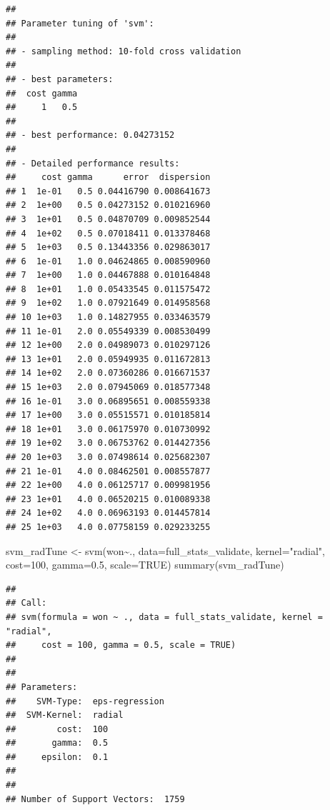 \documentclass[
]{article}
\newenvironment{Shaded}{\begin{snugshade}}{\end{snugshade}}
\newcommand{\AttributeTok}[1]{\textcolor[rgb]{0.77,0.63,0.00}{#1}}
\newcommand{\ConstantTok}[1]{\textcolor[rgb]{0.00,0.00,0.00}{#1}}
\newcommand{\DecValTok}[1]{\textcolor[rgb]{0.00,0.00,0.81}{#1}}
\newcommand{\FloatTok}[1]{\textcolor[rgb]{0.00,0.00,0.81}{#1}}
\newcommand{\FunctionTok}[1]{\textcolor[rgb]{0.00,0.00,0.00}{#1}}
\newcommand{\NormalTok}[1]{#1}
\newcommand{\OtherTok}[1]{\textcolor[rgb]{0.56,0.35,0.01}{#1}}
\newcommand{\SpecialCharTok}[1]{\textcolor[rgb]{0.00,0.00,0.00}{#1}}
\newcommand{\StringTok}[1]{\textcolor[rgb]{0.31,0.60,0.02}{#1}}
\begin{document}
\begin{verbatim}
## 
## Parameter tuning of 'svm':
## 
## - sampling method: 10-fold cross validation 
## 
## - best parameters:
##  cost gamma
##     1   0.5
## 
## - best performance: 0.04273152 
## 
## - Detailed performance results:
##     cost gamma      error  dispersion
## 1  1e-01   0.5 0.04416790 0.008641673
## 2  1e+00   0.5 0.04273152 0.010216960
## 3  1e+01   0.5 0.04870709 0.009852544
## 4  1e+02   0.5 0.07018411 0.013378468
## 5  1e+03   0.5 0.13443356 0.029863017
## 6  1e-01   1.0 0.04624865 0.008590960
## 7  1e+00   1.0 0.04467888 0.010164848
## 8  1e+01   1.0 0.05433545 0.011575472
## 9  1e+02   1.0 0.07921649 0.014958568
## 10 1e+03   1.0 0.14827955 0.033463579
## 11 1e-01   2.0 0.05549339 0.008530499
## 12 1e+00   2.0 0.04989073 0.010297126
## 13 1e+01   2.0 0.05949935 0.011672813
## 14 1e+02   2.0 0.07360286 0.016671537
## 15 1e+03   2.0 0.07945069 0.018577348
## 16 1e-01   3.0 0.06895651 0.008559338
## 17 1e+00   3.0 0.05515571 0.010185814
## 18 1e+01   3.0 0.06175970 0.010730992
## 19 1e+02   3.0 0.06753762 0.014427356
## 20 1e+03   3.0 0.07498614 0.025682307
## 21 1e-01   4.0 0.08462501 0.008557877
## 22 1e+00   4.0 0.06125717 0.009981956
## 23 1e+01   4.0 0.06520215 0.010089338
## 24 1e+02   4.0 0.06963193 0.014457814
## 25 1e+03   4.0 0.07758159 0.029233255
\end{verbatim}

\begin{Shaded}
\begin{Highlighting}[]
\NormalTok{svm\_radTune }\OtherTok{\textless{}{-}} \FunctionTok{svm}\NormalTok{(won}\SpecialCharTok{\textasciitilde{}}\NormalTok{., }\AttributeTok{data=}\NormalTok{full\_stats\_validate, }\AttributeTok{kernel=}\StringTok{"radial"}\NormalTok{, }\AttributeTok{cost=}\DecValTok{100}\NormalTok{, }\AttributeTok{gamma=}\FloatTok{0.5}\NormalTok{, }\AttributeTok{scale=}\ConstantTok{TRUE}\NormalTok{)}
\FunctionTok{summary}\NormalTok{(svm\_radTune)}
\end{Highlighting}
\end{Shaded}

\begin{verbatim}
## 
## Call:
## svm(formula = won ~ ., data = full_stats_validate, kernel = "radial", 
##     cost = 100, gamma = 0.5, scale = TRUE)
## 
## 
## Parameters:
##    SVM-Type:  eps-regression 
##  SVM-Kernel:  radial 
##        cost:  100 
##       gamma:  0.5 
##     epsilon:  0.1 
## 
## 
## Number of Support Vectors:  1759
\end{verbatim}
\end{document}
